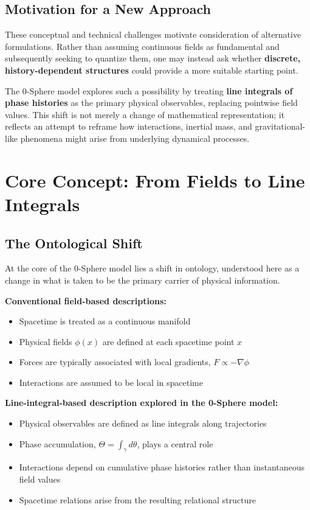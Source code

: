 \documentclass[12pt,letterpaper]{article}
\begin{document}
\subsection{Motivation for a New Approach}
\label{subsec:new_approach}

These conceptual and technical challenges motivate consideration of alternative formulations. Rather than assuming continuous fields as fundamental and subsequently seeking to quantize them, one may instead ask whether \textbf{discrete, history-dependent structures} could provide a more suitable starting point.

The 0-Sphere model explores such a possibility by treating \textbf{line integrals of phase histories} as the primary physical observables, replacing pointwise field values. This shift is not merely a change of mathematical representation; it reflects an attempt to reframe how interactions, inertial mass, and gravitational-like phenomena might arise from underlying dynamical processes.



\section{Core Concept: From Fields to Line Integrals}
\label{sec:core_concept}

\justifying

\subsection{The Ontological Shift}
\label{subsec:ontological_shift}

At the core of the 0-Sphere model lies a shift in ontology, understood here as a change in what is taken to be the primary carrier of physical information.

\textbf{Conventional field-based descriptions:}
\begin{itemize}
\item Spacetime is treated as a continuous manifold
\item Physical fields $\phi(x)$ are defined at each spacetime point $x$
\item Forces are typically associated with local gradients, $F \propto -\nabla \phi$
\item Interactions are assumed to be local in spacetime
\end{itemize}

\textbf{Line-integral-based description explored in the 0-Sphere model:}
\begin{itemize}
\item Physical observables are defined as line integrals along trajectories
\item Phase accumulation, $\Theta = \int_\gamma d\theta$, plays a central role
\item Interactions depend on cumulative phase histories rather than instantaneous field values
\item Spacetime relations arise from the resulting relational structure
\end{itemize}
\end{document}
